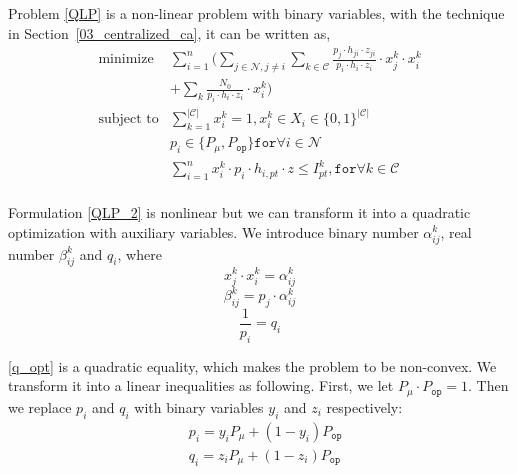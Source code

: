 \documentclass[times]{ettauth}
\theoremstyle{mytheoremstyle}
\theoremstyle{mytheoremstyle}
\theoremstyle{mytheoremstyle}
\begin{document}
Problem \ref{QLP} is a non-linear problem with binary variables, with the technique in Section~\ref{03_centralized_ca}, it can be written as,
	\begin{equation}
\label{QLP_2}
			\begin{aligned}
			\underset{}{\text{minimize}}
			& \sum\limits^{n}_{i=1} ( \sum\limits_{j\in\mathcal{N}, j\neq i}\sum\limits_{k\in\mathcal{C}} \frac{p_j\cdot h_{ji}\cdot z_{ji}}{p_i\cdot h_i\cdot z_i}\cdot  x_j^k\cdot x_i^k  \\
			& + \sum\limits_k \frac{N_0}{p_i\cdot h_i\cdot z_i}\cdot x_i^k)\\
			\text{subject to} 
			& \sum\limits_{k=1}^{|\mathcal{C}|}x_i^k=1, x_i^k\in X_i\in \{0,1\}^{|\mathcal{C}|}\\
			& p_i\in \{P_\mu, P_{\mathtt{op}}\} \mathtt{for} \forall i\in \mathcal{N}\\
			& \sum\limits^{n}_{i=1}x_i^k\cdot p_i\cdot h_{i,pt}\cdot z \leq I^k_{pt}, \mathtt{for}\forall k\in \mathcal{C} \\
			\end{aligned}
		\end{equation}
		
Formulation \ref{QLP_2} is nonlinear but we can transform it into a quadratic optimization with auxiliary variables.
We introduce binary number $\alpha_{ij}^k$, real number $\beta_{ij}^k$ and $q_i$, where
	\begin{equation}
	\label{alpha_opt}
x_j^k\cdot x_i^k =\alpha_{ij}^k
	\end{equation}
	\begin{equation}
	\label{beta_opt}
\beta_{ij}^k = p_j\cdot \alpha_{ij}^k
	\end{equation}
	\begin{equation}
	\label{q_opt}	
\frac{1}{p_i} = q_i
	\end{equation}
	
	\ref{q_opt} is a quadratic equality, which makes the problem to be non-convex. 
	We transform it into a linear inequalities as following.
	First, we let $P_\mu \cdot P_{\mathtt{op}} = 1$.
	Then we replace $p_i$ and $q_i$ with binary variables $y_i$ and $z_i$ respectively:
	\begin{equation}
	\label{p_to_binary}	
	\begin{aligned}
& p_i = y_i P_\mu + (1-y_i) P_{\mathtt{op}}\\
& q_i = z_i P_\mu + (1-z_i) P_{\mathtt{op}}\\
   \end{aligned}
	\end{equation}	
	
\end{document}

